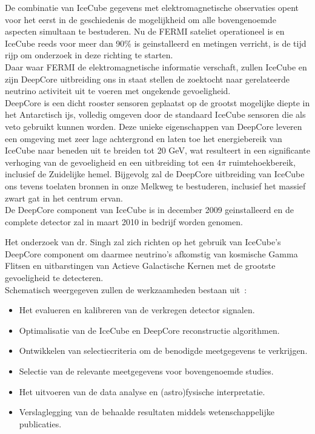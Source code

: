 \documentclass[11pt,a4paper,pdftex]{report}
\begin{document}
De combinatie van IceCube gegevens met elektromagnetische observaties opent voor het eerst in de
geschiedenis de mogelijkheid om alle bovengenoemde aspecten simultaan te bestuderen.
Nu de FERMI sateliet operationeel is en IceCube reeds voor meer dan 90\% is geinstalleerd en metingen
verricht, is de tijd rijp om onderzoek in deze richting te starten.\\
Daar waar FERMI de elektromagnetische informatie verschaft, zullen IceCube en zijn DeepCore uitbreiding ons
in staat stellen de zoektocht naar gerelateerde neutrino activiteit uit te voeren met ongekende gevoeligheid.\\
DeepCore is een dicht rooster sensoren geplaatst op de grootst mogelijke diepte in het Antarctisch ijs,
volledig omgeven door de standaard IceCube sensoren die als veto gebruikt kunnen worden.
Deze unieke eigenschappen van DeepCore leveren een omgeving met zeer lage achtergrond en laten toe het
energiebereik van IceCube naar beneden uit te breiden tot 20 GeV, wat resulteert in een significante verhoging
van de gevoeligheid en een uitbreiding tot een $4\pi$ ruimtehoekbereik, inclusief de Zuidelijke hemel.
Bijgevolg zal de DeepCore uitbreiding van IceCube ons tevens toelaten bronnen in onze Melkweg te bestuderen,
inclusief het massief zwart gat in het centrum ervan.\\
De DeepCore component van IceCube is in december 2009 geinstalleerd en de complete detector zal in maart 2010
in bedrijf worden genomen.

Het onderzoek van dr. Singh zal zich richten op het gebruik van IceCube's DeepCore component
om daarmee neutrino's afkomstig van kosmische Gamma Flitsen en uitbarstingen van Actieve Galactische Kernen
met de grootste gevoeligheid te detecteren.\\
Schematisch weergegeven zullen de werkzaamheden bestaan uit~:
%
\begin{itemize}
\item Het evalueren en kalibreren van de verkregen detector signalen.
\item Optimalisatie van de IceCube en DeepCore reconstructie algorithmen.
\item Ontwikkelen van selectiecriteria om de benodigde meetgegevens te verkrijgen.
\item Selectie van de relevante meetgegevens voor bovengenoemde studies.
\item Het uitvoeren van de data analyse en (astro)fysische interpretatie.
\item Verslaglegging van de behaalde resultaten middels wetenschappelijke publicaties.
\end{itemize}
\end{document}

